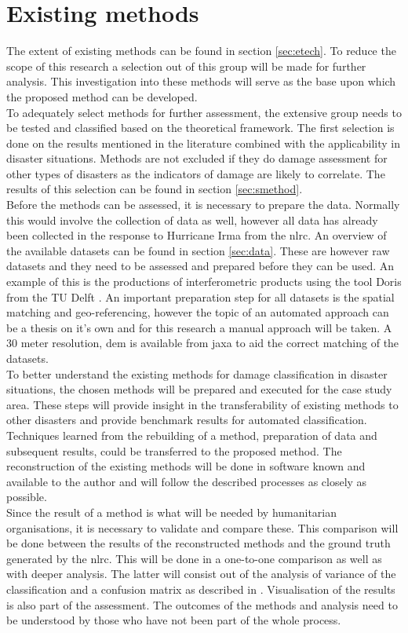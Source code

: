 \section {Existing methods} \label{emethod}
The extent of existing methods can be found in section \ref{sec:etech}. To reduce the scope of this research a selection out of this group will be made for further analysis. This investigation into these methods will serve as the base upon which the proposed method can be developed.\\
To adequately select methods for further assessment, the extensive group needs to be tested and classified based on the theoretical framework. The first selection is done on the results mentioned in the literature combined with the applicability in disaster situations. Methods are not excluded if they do damage assessment for other types of disasters as the indicators of damage are likely to correlate. The results of this selection can be found in section \ref{sec:smethod}.\\
Before the methods can be assessed, it is necessary to prepare the data. Normally this would involve the collection of data as well, however all data has already been collected in the response to Hurricane Irma from the \ac{nlrc}. An overview of the available datasets can be found in section \ref{sec:data}. These are however raw datasets and they need to be assessed and prepared before they can be used. An example of this is the productions of interferometric products using the tool Doris from the TU Delft \citep{Mgp}. An important preparation step for all datasets is the spatial matching and geo-referencing, however the topic of an automated approach can be a thesis on it's own and for this research a manual approach will be taken. A 30 meter resolution, \ac{dem} is available from \ac{jaxa} \citep{JAXA2017} to aid the correct matching of the datasets. \\
To better understand the existing methods for damage classification in disaster situations, the chosen methods will be prepared and executed for the case study area. These steps will provide insight in the transferability of existing methods to other disasters and provide benchmark results for automated classification. Techniques learned from the rebuilding of a method, preparation of data and subsequent results, could be transferred to the proposed method. The reconstruction of the existing methods will be done in software known and available to the author and will follow the described processes as closely as possible. \\
Since the result of a method is what will be needed by humanitarian organisations, it is necessary to validate and compare these. This comparison will be done between the results of the reconstructed methods and the ground truth generated by the \ac{nlrc}. This will be done in a one-to-one comparison as well as with deeper analysis. The latter will consist out of the analysis of variance of the classification and a confusion matrix as described in \citep{Antonietta2015}. Visualisation of the results is also part of the assessment. The outcomes of the methods and analysis need to be understood by those who have not been part of the whole process.\\

